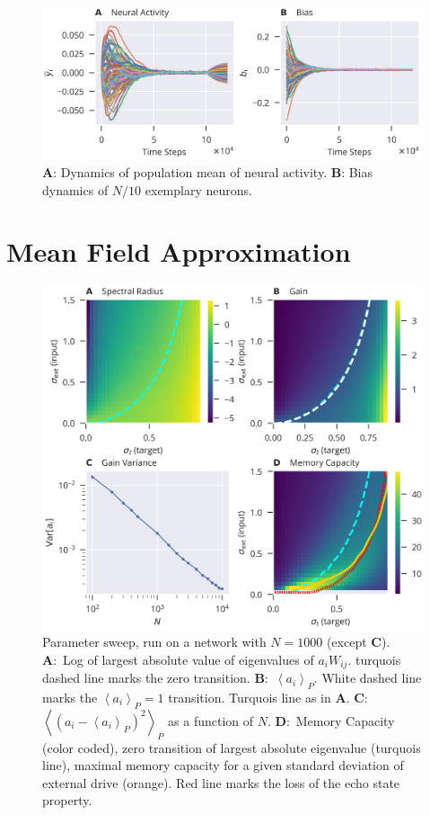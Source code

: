 \documentclass[10pt,a4paper]{article}
\newcommand{\avgp}[1]{\left< #1 \right>_P}
\begin{document}
\begin{figure}[h]
	\centering
	\includegraphics[width=\textwidth]{../plots/res_comp_act_bias.png}
	\caption{{\bf A}: Dynamics of population mean of neural activity. {\bf B}: Bias dynamics of $N/10$ exemplary neurons. }
\end{figure}

\section{Mean Field Approximation}

\begin{figure}[t]
	\centering
	\includegraphics[width=\textwidth]{../plots/std_in_std_target_sweep_fig.png}
	\caption{Parameter sweep, run on a network with $N=1000$ (except {\bf C}). {\bf A}:~Log of largest absolute value of eigenvalues of $a_i W_{ij}$. turquois dashed line marks the zero transition. {\bf B}:~$\avgp{a_i}$.  White dashed line marks the $\avgp{a_i} = 1$ transition. Turquois line as in {\bf A}. {\bf C}:~$\avgp{(a_i - \avgp{a_i})^2}$ as a function of $N$. {\bf D}:~Memory Capacity (color coded), zero transition of largest absolute eigenvalue (turquois line), maximal memory capacity for a given standard deviation of external drive (orange). Red line marks the loss of the echo state property.}
	\label{fig:gain_std_in_std_targ_sweep}
\end{figure}
\end{document}
